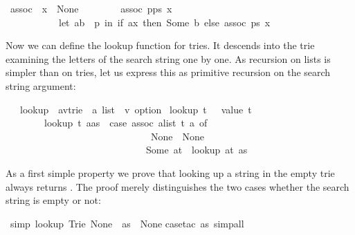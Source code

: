 \begin{isabellebody}
\ {\isachardoublequote}assoc\ {\isacharbrackleft}{\isacharbrackright}\ x\ {\isacharequal}\ None{\isachardoublequote}\isanewline
\ \ \ \ \ \ \ \ {\isachardoublequote}assoc\ {\isacharparenleft}p{\isacharhash}ps{\isacharparenright}\ x\ {\isacharequal}\isanewline
\ \ \ \ \ \ \ \ \ \ \ {\isacharparenleft}let\ {\isacharparenleft}a{\isacharcomma}b{\isacharparenright}\ {\isacharequal}\ p\ in\ if\ a{\isacharequal}x\ then\ Some\ b\ else\ assoc\ ps\ x{\isacharparenright}{\isachardoublequote}%
\begin{isamarkuptext}%
Now we can define the lookup function for tries. It descends into the trie
examining the letters of the search string one by one. As
recursion on lists is simpler than on tries, let us express this as primitive
recursion on the search string argument:%
\end{isamarkuptext}%
\ \ \ lookup\ {\isacharcolon}{\isacharcolon}\ {\isachardoublequote}{\isacharparenleft}{\isacharprime}a{\isacharcomma}{\isacharprime}v{\isacharparenright}trie\ {\isasymRightarrow}\ {\isacharprime}a\ list\ {\isasymRightarrow}\ {\isacharprime}v\ option{\isachardoublequote}\isanewline
{}\ {\isachardoublequote}lookup\ t\ {\isacharbrackleft}{\isacharbrackright}\ {\isacharequal}\ value\ t{\isachardoublequote}\isanewline
\ \ \ \ \ \ \ \ {\isachardoublequote}lookup\ t\ {\isacharparenleft}a{\isacharhash}as{\isacharparenright}\ {\isacharequal}\ {\isacharparenleft}case\ assoc\ {\isacharparenleft}alist\ t{\isacharparenright}\ a\ of\isanewline
\ \ \ \ \ \ \ \ \ \ \ \ \ \ \ \ \ \ \ \ \ \ \ \ \ \ \ \ \ \ None\ {\isasymRightarrow}\ None\isanewline
\ \ \ \ \ \ \ \ \ \ \ \ \ \ \ \ \ \ \ \ \ \ \ \ \ \ \ \ {\isacharbar}\ Some\ at\ {\isasymRightarrow}\ lookup\ at\ as{\isacharparenright}{\isachardoublequote}%
\begin{isamarkuptext}%
As a first simple property we prove that looking up a string in the empty
trie  always returns . The proof merely
distinguishes the two cases whether the search string is empty or not:%
\end{isamarkuptext}%
\ {\isacharbrackleft}simp{\isacharbrackright}{\isacharcolon}\ {\isachardoublequote}lookup\ {\isacharparenleft}Trie\ None\ {\isacharbrackleft}{\isacharbrackright}{\isacharparenright}\ as\ {\isacharequal}\ None{\isachardoublequote}\isanewline
{}case{\isacharunderscore}tac\ as{\isacharcomma}\ simp{\isacharunderscore}all{\isacharparenright}\isanewline

\end{isabellebody}
